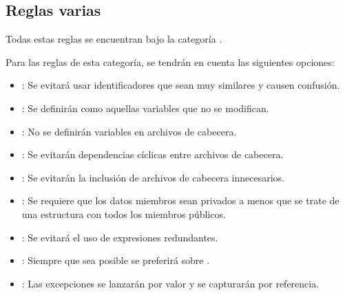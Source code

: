 \subsection{Reglas varias}

Todas estas reglas se encuentran bajo la categoría .

Para las reglas de esta categoría, se tendrán en cuenta las siguientes
opciones:

\begin{itemize}

\item {}:
Se evitará usar identificadores que sean muy similares y causen confusión.

\item {}:
Se definirán como  aquellas variables que no se modifican.

\item {}:
No se definirán variables en archivos de cabecera.

\item {}:
Se evitarán dependencias cíclicas entre archivos de cabecera.

\item {}:
Se evitarán la inclusión de archivos de cabecera innecesarios.

\item {}:
Se requiere que los datos miembros sean privados a menos que se trate de
una estructura con todos los miembros públicos.

\item {}:
Se evitará el uso de expresiones redundantes.

\item {}:
Siempre que sea posible se preferirá  sobre .

\item {}:
Las excepciones se lanzarán por valor y se capturarán por referencia.

\end{itemize}
